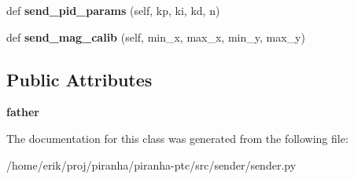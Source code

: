 \begin{DoxyCompactItemize}
\item 
def {\bfseries send\+\_\+pid\+\_\+params} (self, kp, ki, kd, n)\hypertarget{classsender_1_1Sender_a877682f983602f338f5fbe417500b561}{}\label{classsender_1_1Sender_a877682f983602f338f5fbe417500b561}

\item 
def {\bfseries send\+\_\+mag\+\_\+calib} (self, min\+\_\+x, max\+\_\+x, min\+\_\+y, max\+\_\+y)\hypertarget{classsender_1_1Sender_aa059878c0d2658ce632cfc1771b6326d}{}\label{classsender_1_1Sender_aa059878c0d2658ce632cfc1771b6326d}

\end{DoxyCompactItemize}
\subsection*{Public Attributes}
\begin{DoxyCompactItemize}
\item 
{\bfseries father}\hypertarget{classsender_1_1Sender_a9e205d2dfa36542ab04dafe87072456e}{}\label{classsender_1_1Sender_a9e205d2dfa36542ab04dafe87072456e}

\end{DoxyCompactItemize}


The documentation for this class was generated from the following file\+:\begin{DoxyCompactItemize}
\item 
/home/erik/proj/piranha/piranha-\/ptc/src/sender/sender.\+py\end{DoxyCompactItemize}
